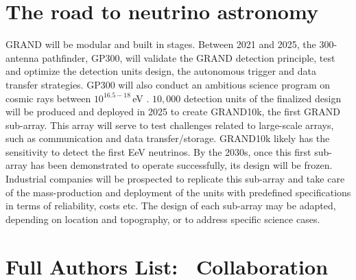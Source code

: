 \documentclass[a4paper,11pt]{article}
\newcounter{affil}
\begin{document}
\section{The road to neutrino astronomy}

GRAND will be modular and built in stages. Between 2021 and 2025, the 300-antenna pathfinder, GP300, will validate the GRAND detection principle, test and optimize the detection units design, the autonomous trigger and data transfer strategies. GP300 will also conduct an ambitious science program on cosmic rays between $10^{16.5-18}\,$eV \cite{GP300_ICRC2021}. $10,000$ detection units of the finalized design will be produced and deployed in 2025 to create GRAND10k, the first GRAND sub-array. This array will serve to test challenges related to large-scale arrays, such as communication and data transfer/storage. GRAND10k likely has the sensitivity to detect the first EeV neutrinos. By the 2030s, once this first sub-array has been demonstrated to operate successfully, its design will be frozen. Industrial companies will be prospected to replicate this sub-array and take care of the mass-production and deployment of the units with predefined specifications in terms of reliability, costs etc. The design of each sub-array may be adapted, depending on location and topography, or to address specific science cases.







{\footnotesize

}
\clearpage
\section*{Full Authors List: \Coll\ Collaboration}



%
%
\end{document}
